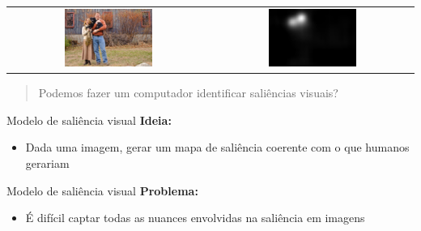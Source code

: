 \documentclass[10pt]{beamer}
\newcommand{\tbf}[1]{\textbf{#1}}
\begin{document}
\begin{frame}{}
    \begin{center}
        \begin{tabular} {cc}
        \includegraphics[width=0.45\textwidth]{./img/couple.jpg} &
        \includegraphics[width=0.45\textwidth]{./img/couple_map.jpg}
        \end{tabular}
    \end{center}
\end{frame}

\begin{frame}{}
    \begin{quote}
        Podemos fazer um computador identificar saliências visuais?
    \end{quote}
\end{frame}

\begin{frame}{Modelo de saliência visual}
    \tbf{Ideia:}
    \begin{itemize}[<+->]
        \item Dada uma imagem, gerar um mapa de saliência coerente
            com o que humanos gerariam
    \end{itemize}
\end{frame}

\begin{frame}{Modelo de saliência visual}
    \tbf{Problema:}
    \begin{itemize}[<+->]
        \item É difícil captar todas as nuances envolvidas na saliência
            em imagens
    \end{itemize}
\end{frame}
\end{document}
